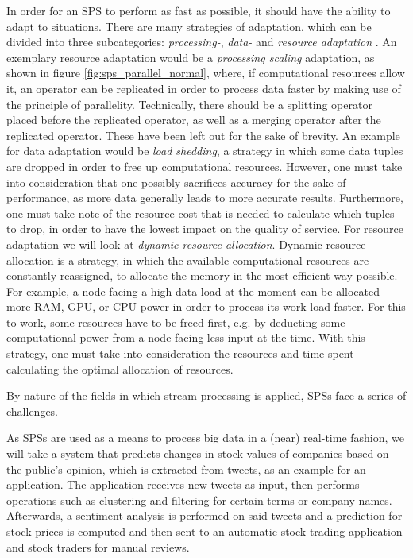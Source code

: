         \quad In order for an SPS to perform as fast as possible, it should have the ability to adapt to situations.
        There are many strategies of adaptation, which can be divided into three subcategories: \textit{processing-}, \textit{data-} and 
        \textit{resource adaptation} \cite[p. 8 f.]{QIN20191}. 
        An exemplary resource adaptation would be a \textit{processing scaling} adaptation, as shown in figure \ref{fig:sps_parallel_normal}, 
        where, if computational resources allow it, an operator can be replicated in order to process data faster by
        making use of the principle of parallelity. Technically, there should be a splitting operator placed before the replicated operator, 
        as well as a merging operator after the replicated operator. These have been left out for the sake of brevity.
        An example for data adaptation would be \textit{load shedding}, a strategy in which some data tuples are dropped in order to free up computational resources.
        However, one must take into consideration that one possibly sacrifices accuracy for the sake of performance, as more data generally leads to more accurate results.
        Furthermore, one must take note of the resource cost that is needed to calculate which tuples to drop, in order to have the lowest impact on the quality of service.
        For resource adaptation we will look at \textit{dynamic resource allocation}. Dynamic resource allocation is a strategy, in which the available computational 
        resources are constantly reassigned, to allocate the memory in the most efficient way possible. For example, a node facing a high data load at the moment can 
        be allocated more RAM, GPU, or CPU power in order to process its work load faster. For this to work, some resources have to be freed first, e.g. by deducting some
        computational power from a node facing less input at the time. With this strategy, one must take into consideration the resources and time spent calculating 
        the optimal allocation of resources.

        \quad By nature of the fields in which stream processing is applied, SPSs face a series of challenges.
        
        \quad As SPSs are used as a means to process big data in a (near) real-time fashion, we will take a system that predicts changes in stock values 
        of companies based on the public's opinion, which is extracted from tweets, as an example for an application.
        The application receives new \gls{tweet}s as input, then performs operations such as clustering and filtering for certain terms or company names. 
        Afterwards, a sentiment analysis is performed on said tweets and a prediction for stock prices is computed and then sent 
        to an automatic stock trading application and stock traders for manual reviews.


